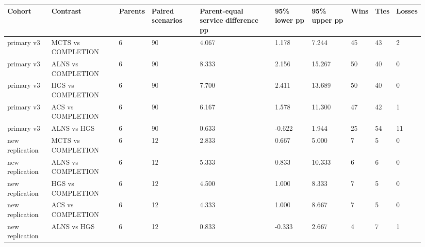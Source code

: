 \begin{tabular}{llllllllll}
\hline
Cohort & Contrast & Parents & Paired scenarios & Parent-equal service difference pp & 95\% lower pp & 95\% upper pp & Wins & Ties & Losses \\
\hline
primary v3 & MCTS vs COMPLETION & 6 & 90 & 4.067 & 1.178 & 7.244 & 45 & 43 & 2 \\
primary v3 & ALNS vs COMPLETION & 6 & 90 & 8.333 & 2.156 & 15.267 & 50 & 40 & 0 \\
primary v3 & HGS vs COMPLETION & 6 & 90 & 7.700 & 2.411 & 13.689 & 50 & 40 & 0 \\
primary v3 & ACS vs COMPLETION & 6 & 90 & 6.167 & 1.578 & 11.300 & 47 & 42 & 1 \\
primary v3 & ALNS vs HGS & 6 & 90 & 0.633 & -0.622 & 1.944 & 25 & 54 & 11 \\
new replication & MCTS vs COMPLETION & 6 & 12 & 2.833 & 0.667 & 5.000 & 7 & 5 & 0 \\
new replication & ALNS vs COMPLETION & 6 & 12 & 5.333 & 0.833 & 10.333 & 6 & 6 & 0 \\
new replication & HGS vs COMPLETION & 6 & 12 & 4.500 & 1.000 & 8.333 & 7 & 5 & 0 \\
new replication & ACS vs COMPLETION & 6 & 12 & 4.333 & 1.000 & 8.667 & 7 & 5 & 0 \\
new replication & ALNS vs HGS & 6 & 12 & 0.833 & -0.333 & 2.667 & 4 & 7 & 1 \\
\hline
\end{tabular}
